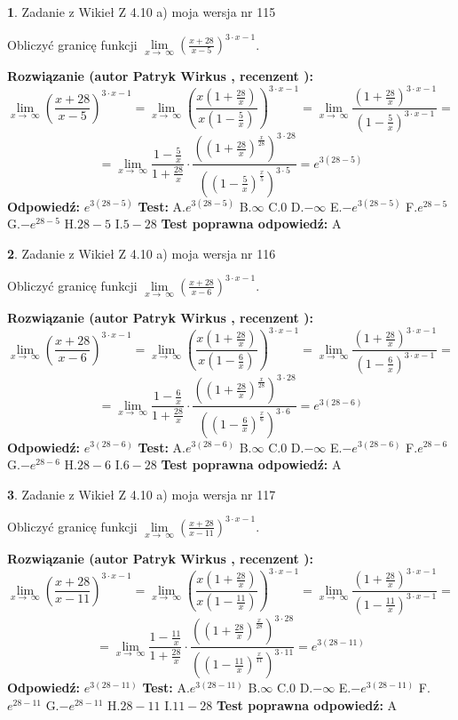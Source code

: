\documentclass[12pt, a4paper]{article}
\theoremstyle{definition} %
\newtheorem{zad}{}
\newcommand{\zadStart}[1]{\begin{zad}#1\newline}
\newcommand{\zadStop}{\end{zad}}
\newcommand{\rozwStart}[2]{\noindent \textbf{Rozwiązanie (autor #1 , recenzent #2): }\newline}
\newcommand{\rozwStop}{\newline}
\newcommand{\odpStart}{\noindent \textbf{Odpowiedź:}\newline}
\newcommand{\odpStop}{\newline}
\newcommand{\testStart}{\noindent \textbf{Test:}\newline}
\newcommand{\testStop}{\newline}
\newcommand{\kluczStart}{\noindent \textbf{Test poprawna odpowiedź:}\newline}
\newcommand{\kluczStop}{\newline}
\begin{document}
\zadStart{Zadanie z Wikieł Z 4.10 a) moja wersja nr 115}


Obliczyć granicę funkcji  $\lim\limits_{x\to\ \infty}(\frac{x+28}{x-5})^{3\cdot x-1}$.
\zadStop
\rozwStart{Patryk Wirkus}{}
$$\lim\limits_{x\to\ \infty}(\frac{x+28}{x-5})^{3\cdot x-1} = \lim\limits_{x\to\ \infty}(\frac{x(1+\frac{28}{x})}{x(1-\frac{5}{x})})^{3\cdot x-1}=\lim\limits_{x\to\ \infty}\frac{(1+\frac{28}{x})^{3\cdot x-1}}{(1-\frac{5}{x})^{3\cdot x-1}}=$$
$$=\lim\limits_{x\to\ \infty}\frac{1-\frac{5}{x}}{1+\frac{28}{x}}\cdot\frac{((1+\frac{28}{x})^{\frac{x}{28}})^{3\cdot28}}{((1-\frac{5}{x})^{\frac{x}{5}})^{3\cdot5}}=e^{3(28-5)}$$
\rozwStop
\odpStart
$e^{3(28-5)}$
\odpStop
\testStart
A.$e^{3(28-5)}$ B.$\infty$ C.$0$ D.$-\infty$ E.$-e^{3(28-5)}$
F.$e^{28-5}$ G.$-e^{28-5}$
H.$28-5$
I.$5-28$
\testStop
\kluczStart
A
\kluczStop



\zadStart{Zadanie z Wikieł Z 4.10 a) moja wersja nr 116}


Obliczyć granicę funkcji  $\lim\limits_{x\to\ \infty}(\frac{x+28}{x-6})^{3\cdot x-1}$.
\zadStop
\rozwStart{Patryk Wirkus}{}
$$\lim\limits_{x\to\ \infty}(\frac{x+28}{x-6})^{3\cdot x-1} = \lim\limits_{x\to\ \infty}(\frac{x(1+\frac{28}{x})}{x(1-\frac{6}{x})})^{3\cdot x-1}=\lim\limits_{x\to\ \infty}\frac{(1+\frac{28}{x})^{3\cdot x-1}}{(1-\frac{6}{x})^{3\cdot x-1}}=$$
$$=\lim\limits_{x\to\ \infty}\frac{1-\frac{6}{x}}{1+\frac{28}{x}}\cdot\frac{((1+\frac{28}{x})^{\frac{x}{28}})^{3\cdot28}}{((1-\frac{6}{x})^{\frac{x}{6}})^{3\cdot6}}=e^{3(28-6)}$$
\rozwStop
\odpStart
$e^{3(28-6)}$
\odpStop
\testStart
A.$e^{3(28-6)}$ B.$\infty$ C.$0$ D.$-\infty$ E.$-e^{3(28-6)}$
F.$e^{28-6}$ G.$-e^{28-6}$
H.$28-6$
I.$6-28$
\testStop
\kluczStart
A
\kluczStop



\zadStart{Zadanie z Wikieł Z 4.10 a) moja wersja nr 117}


Obliczyć granicę funkcji  $\lim\limits_{x\to\ \infty}(\frac{x+28}{x-11})^{3\cdot x-1}$.
\zadStop
\rozwStart{Patryk Wirkus}{}
$$\lim\limits_{x\to\ \infty}(\frac{x+28}{x-11})^{3\cdot x-1} = \lim\limits_{x\to\ \infty}(\frac{x(1+\frac{28}{x})}{x(1-\frac{11}{x})})^{3\cdot x-1}=\lim\limits_{x\to\ \infty}\frac{(1+\frac{28}{x})^{3\cdot x-1}}{(1-\frac{11}{x})^{3\cdot x-1}}=$$
$$=\lim\limits_{x\to\ \infty}\frac{1-\frac{11}{x}}{1+\frac{28}{x}}\cdot\frac{((1+\frac{28}{x})^{\frac{x}{28}})^{3\cdot28}}{((1-\frac{11}{x})^{\frac{x}{11}})^{3\cdot11}}=e^{3(28-11)}$$
\rozwStop
\odpStart
$e^{3(28-11)}$
\odpStop
\testStart
A.$e^{3(28-11)}$ B.$\infty$ C.$0$ D.$-\infty$ E.$-e^{3(28-11)}$
F.$e^{28-11}$ G.$-e^{28-11}$
H.$28-11$
I.$11-28$
\testStop
\kluczStart
A
\kluczStop
\end{document}

